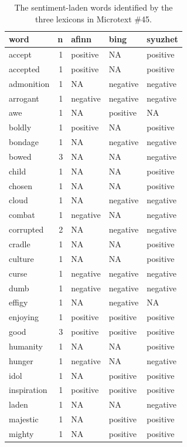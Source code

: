 \documentclass[
  letterpaper,
  DIV=11,
  numbers=noendperiod]{scrartcl}
\begin{document}
\begin{longtable}[]{@{}lrlll@{}}

\caption{\label{tbl-45-words}The sentiment-laden words identified by the
three lexicons in Microtext \#45.}

\tabularnewline

\toprule\noalign{}
word & n & afinn & bing & syuzhet \\
\midrule\noalign{}
\endhead
\bottomrule\noalign{}
\endlastfoot
accept & 1 & positive & NA & positive \\
accepted & 1 & positive & NA & positive \\
admonition & 1 & NA & negative & negative \\
arrogant & 1 & negative & negative & negative \\
awe & 1 & NA & positive & NA \\
boldly & 1 & positive & NA & positive \\
bondage & 1 & NA & negative & negative \\
bowed & 3 & NA & NA & negative \\
child & 1 & NA & NA & positive \\
chosen & 1 & NA & NA & positive \\
cloud & 1 & NA & negative & negative \\
combat & 1 & negative & NA & negative \\
corrupted & 2 & NA & negative & negative \\
cradle & 1 & NA & NA & positive \\
culture & 1 & NA & NA & positive \\
curse & 1 & negative & negative & negative \\
dumb & 1 & negative & negative & negative \\
effigy & 1 & NA & negative & NA \\
enjoying & 1 & positive & positive & positive \\
good & 3 & positive & positive & positive \\
humanity & 1 & NA & NA & positive \\
hunger & 1 & negative & NA & negative \\
idol & 1 & NA & positive & positive \\
inspiration & 1 & positive & positive & positive \\
laden & 1 & NA & NA & negative \\
majestic & 1 & NA & positive & positive \\
mighty & 1 & NA & positive & positive \\

\end{longtable}
\end{document}
